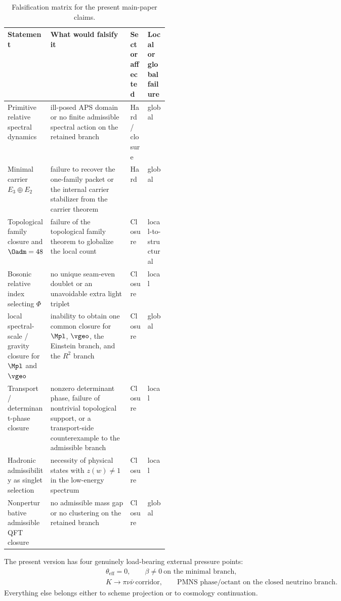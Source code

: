 \begin{table}[t]
\centering
\small
\begin{tabularx}{\linewidth}{@{}>{\raggedright\arraybackslash}p{0.24\linewidth}YY>{\raggedright\arraybackslash}p{0.13\linewidth}@{}}
\toprule
Statement & What would falsify it & Sector affected & Local or global failure \\
\midrule
Primitive relative spectral dynamics & ill-posed APS domain or no finite admissible spectral action on the retained branch & Hard / closure & global \\
Minimal carrier $E_3\oplus E_2$ & failure to recover the one-family packet or the internal carrier stabilizer from the carrier theorem & Hard & global \\
Topological family closure and $\Oadm=48$ & failure of the topological family theorem to globalize the local count & Closure & local-to-structural \\
Bosonic relative index selecting $\Phi$ & no unique seam-even doublet or an unavoidable extra light triplet & Closure & local \\
local spectral-scale / gravity closure for $\Mpl$ and $\vgeo$ & inability to obtain one common closure for $\Mpl$, $\vgeo$, the Einstein branch, and the $R^2$ branch & Closure & global \\
Transport / determinant-phase closure & nonzero determinant phase, failure of nontrivial topological support, or a transport-side counterexample to the admissible branch & Closure & local \\
Hadronic admissibility as singlet selection & necessity of physical states with $z(w)\neq1$ in the low-energy spectrum & Closure & local \\
Nonperturbative admissible QFT closure & no admissible mass gap or no clustering on the retained branch & Closure & global \\
\bottomrule
\end{tabularx}
\caption{Falsification matrix for the present main-paper claims.}
\label{tab:falsification}
\end{table}

\begin{tcolorbox}[colback=blue!2, colframe=blue!50!black, breakable,
    title={Hard kill rows of the present version}, colbacktitle=blue!60!black]
The present version has four genuinely load-bearing external pressure points:
\[
\begin{aligned}
\theta_{\mathrm{eff}}=0,
\qquad
\beta\neq 0\ \text{on the minimal branch},\\
K\to\pi\nu\bar\nu\ \text{corridor},
\qquad
\text{PMNS phase/octant on the closed neutrino branch}.
\end{aligned}
\]
Everything else belongs either to scheme projection or to cosmology continuation.
\end{tcolorbox}


